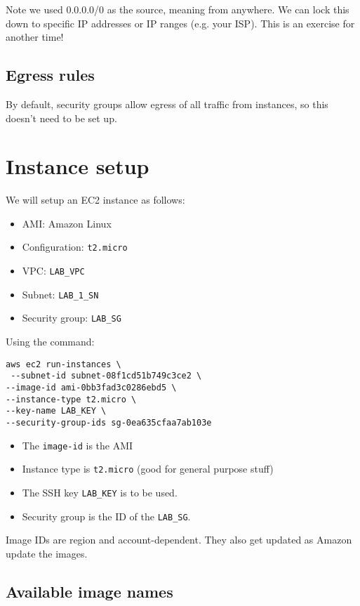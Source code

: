 \documentclass{pgnotes}
\begin{document}
Note we used 0.0.0.0/0 as the source, meaning from anywhere.
We can lock this down to specific IP addresses or IP ranges (e.g. your ISP).
This is an exercise for another time!

\subsection{Egress rules}

By default, security groups allow egress of all traffic from instances, so this doesn't need to be set up. 


\section{Instance setup}

We will setup an EC2 instance as follows:

\begin{itemize}
\item AMI: Amazon Linux
\item Configuration: \texttt{t2.micro} 
\item VPC: \texttt{LAB\_VPC}
\item Subnet: \texttt{LAB\_1\_SN}
\item Security group: \texttt{LAB\_SG}
\end{itemize}

Using the command: 

\begin{verbatim}
aws ec2 run-instances \
 --subnet-id subnet-08f1cd51b749c3ce2 \
--image-id ami-0bb3fad3c0286ebd5 \
--instance-type t2.micro \
--key-name LAB_KEY \
--security-group-ids sg-0ea635cfaa7ab103e
\end{verbatim}

\begin{itemize}
\item The \texttt{image-id} is the AMI 
\item Instance type is \texttt{t2.micro} (good for general purpose stuff)
\item The SSH key \texttt{LAB\_KEY} is to be used.
\item Security group is the ID of the \texttt{LAB\_SG}. 
\end{itemize}

Image IDs are region and account-dependent.
They also get updated as Amazon update the images.

\subsection{Available image names}
\end{document}

